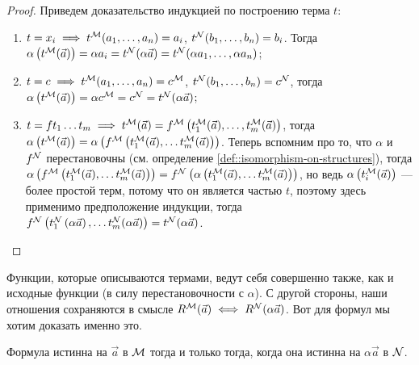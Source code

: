 \begin{proof}
    Приведем доказательство индукцией по построению терма $t$:
    \begin{enumerate}
        \item $t = x_{i} \implies t^{\mathcal{M}}(a_{1}, \ldots, a_{n}) = a_{i}$, $t^{\mathcal{N}}(b_{1}, \ldots, b_{n}) = b_{i}$.
        Тогда $\alpha\left(t^{\mathcal{M}}(\vec{a})\right) = \alpha a_{i} = t^{\mathcal{N}}(\alpha \vec{a}) = t^{\mathcal{N}}(\alpha a_{1}, \ldots, \alpha a_{n})$;
        \item $t = c \implies t^{\mathcal{M}}(a_{1}, \ldots, a_{n}) = c^{\mathcal{M}}$, $t^{\mathcal{N}}(b_{1}, \ldots, b_{n}) = c^{\mathcal{N}}$, тогда $\alpha\left(t^{\mathcal{M}}(\vec{a})\right) = \alpha c^{\mathcal{M}} = c^{\mathcal{N}} = t^{\mathcal{N}}(\alpha \vec{a})$;
        \item $t = f t_{1} \ldots t_{m} \implies t^{\mathcal{M}}(\vec{a}) = f^{\mathcal{M}}\left(t_{1}^{\mathcal{M}}(\vec{a}), \ldots, t_{m}^{\mathcal{M}}(\vec{a})\right)$, тогда $\alpha\left(t^{\mathcal{M}}(\vec{a})\right) = \alpha\left(f^{\mathcal{M}}\left(t_{1}^{\mathcal{M}}(\vec{a}), \ldots t_{m}^{\mathcal{M}}(\vec{a})\right)\right)$.
        Теперь вспомним про то, что $\alpha$ и $f^{\mathcal{N}}$ перестановочны (см. определение \ref{def::isomorphism-on-structures}), тогда $\alpha\left(f^{\mathcal{M}}\left(t_{1}^{\mathcal{M}}(\vec{a}), \ldots t_{m}^{\mathcal{M}}(\vec{a})\right)\right) = f^{\mathcal{N}}\left(\alpha\left(t_{1}^{\mathcal{M}}(\vec{a}), \ldots t_{m}^{\mathcal{M}}(\vec{a})\right)\right)$, но ведь $\alpha\left(t_{i}^{\mathcal{M}}(\vec{a})\right)$ --- более простой терм, потому что он является частью $t$, поэтому здесь применимо предположение индукции, тогда $f^{\mathcal{N}}\left(t_{1}^{\mathcal{N}}\left(\alpha\vec{a}\right), \ldots t_{m}^{\mathcal{N}}(\alpha\vec{a})\right) = t^{\mathcal{N}}(\alpha \vec{a})$. \qedhere
    \end{enumerate}
\end{proof}

Функции, которые описываются термами, ведут себя совершенно также, как и исходные функции (в силу перестановочности с $\alpha$).
С другой стороны, наши отношения сохраняются в смысле $R^{\mathcal{M}}(\vec{a}) \iff R^{\mathcal{N}}(\alpha \vec{a})$.
Вот для формул мы хотим доказать именно это.

\begin{theorem} \label{th::formula-under-isomorphism}
    Формула истинна на $\vec{a}$ в $\mathcal{M}$ тогда и только тогда, когда она истинна на $\alpha \vec{a}$ в $\mathcal{N}$.
\end{theorem}

